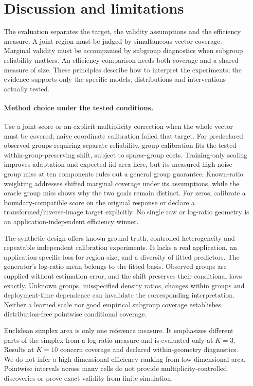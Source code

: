 \section{Discussion and limitations}
\label{sec:limitations}
The evaluation separates the target, the validity assumptions and the efficiency measure. A joint region must be judged by simultaneous vector coverage. Marginal validity must be accompanied by subgroup diagnostics when subgroup reliability matters. An efficiency comparison needs both coverage and a shared measure of size. These principles describe how to interpret the experiments; the evidence supports only the specific models, distributions and interventions actually tested.

\paragraph{Method choice under the tested conditions.}
Use a joint score or an explicit multiplicity correction when the whole vector must be covered; naive coordinate calibration failed that target. For predeclared observed groups requiring separate reliability, group calibration fits the tested within-group-preserving shift, subject to sparse-group costs. Training-only scaling improves adaptation and expected iid area here, but its measured high-noise-group miss at ten components rules out a general group guarantee. Known-ratio weighting addresses shifted marginal coverage under its assumptions, while the oracle group miss shows why the two goals remain distinct. For zeros, calibrate a boundary-compatible score on the original response or declare a transformed/inverse-image target explicitly. No single raw or log-ratio geometry is an application-independent efficiency winner.

The synthetic design offers known ground truth, controlled heterogeneity and repeatable independent calibration experiments. It lacks a real application, an application-specific loss for region size, and a diversity of fitted predictors. The generator's log-ratio mean belongs to the fitted basis. Observed groups are supplied without estimation error, and the shift preserves their conditional laws exactly. Unknown groups, misspecified density ratios, changes within groups and deployment-time dependence can invalidate the corresponding interpretation. Neither a learned scale nor good empirical subgroup coverage establishes distribution-free pointwise conditional coverage.

Euclidean simplex area is only one reference measure. It emphasizes different parts of the simplex from a log-ratio measure and is evaluated only at $K=3$. Results at $K=10$ concern coverage and declared within-geometry diagnostics. We do not infer a high-dimensional efficiency ranking from low-dimensional area. Pointwise intervals across many cells do not provide multiplicity-controlled discoveries or prove exact validity from finite simulation.

